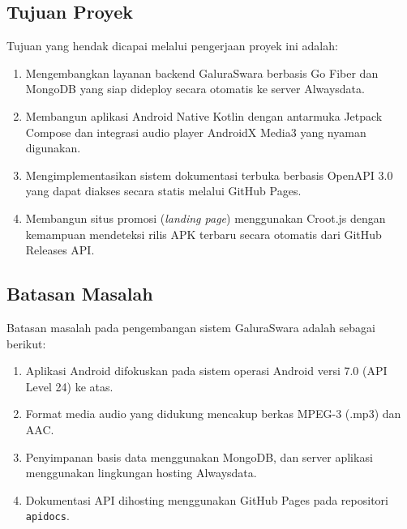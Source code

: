\subsection{Tujuan Proyek}
Tujuan yang hendak dicapai melalui pengerjaan proyek ini adalah:
\begin{enumerate}
    \item Mengembangkan layanan backend GaluraSwara berbasis Go Fiber dan MongoDB yang siap dideploy secara otomatis ke server Alwaysdata.
    \item Membangun aplikasi Android Native Kotlin dengan antarmuka Jetpack Compose dan integrasi audio player AndroidX Media3 yang nyaman digunakan.
    \item Mengimplementasikan sistem dokumentasi terbuka berbasis OpenAPI 3.0 yang dapat diakses secara statis melalui GitHub Pages.
    \item Membangun situs promosi (\textit{landing page}) menggunakan Croot.js dengan kemampuan mendeteksi rilis APK terbaru secara otomatis dari GitHub Releases API.
\end{enumerate}

\subsection{Batasan Masalah}
Batasan masalah pada pengembangan sistem GaluraSwara adalah sebagai berikut:
\begin{enumerate}
    \item Aplikasi Android difokuskan pada sistem operasi Android versi 7.0 (API Level 24) ke atas.
    \item Format media audio yang didukung mencakup berkas MPEG-3 (.mp3) dan AAC.
    \item Penyimpanan basis data menggunakan MongoDB, dan server aplikasi menggunakan lingkungan hosting Alwaysdata.
    \item Dokumentasi API dihosting menggunakan GitHub Pages pada repositori \texttt{apidocs}.
\end{enumerate}

